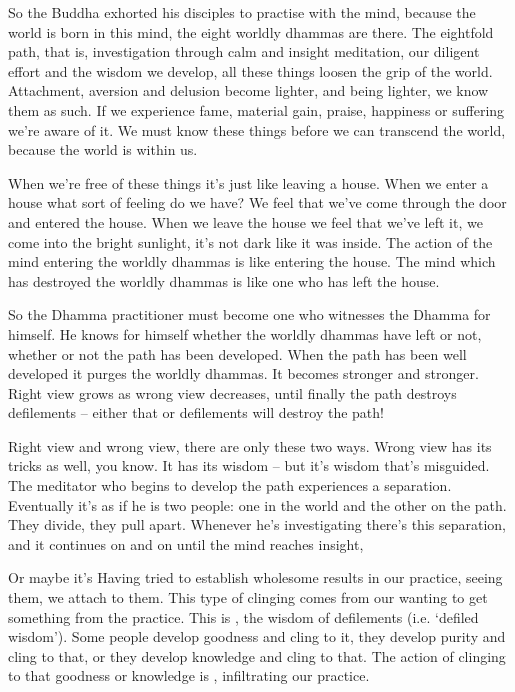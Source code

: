 So the Buddha exhorted his disciples to practise with the mind, because the world is born in this mind, the eight worldly dhammas are there. The eightfold path, that is, investigation through calm and insight meditation, our diligent effort and the wisdom we develop, all these things loosen the grip of the world. Attachment, aversion and delusion become lighter, and being lighter, we know them as such. If we experience fame, material gain, praise, happiness or suffering we're aware of it. We must know these things before we can transcend the world, because the world is within us. 

When we're free of these things it's just like leaving a house. When we enter a house what sort of feeling do we have? We feel that we've come through the door and entered the house. When we leave the house we feel that we've left it, we come into the bright sunlight, it's not dark like it was inside. The action of the mind entering the worldly dhammas is like entering the house. The mind which has destroyed the worldly dhammas is like one who has left the house. 

So the Dhamma practitioner must become one who witnesses the Dhamma for himself. He knows for himself whether the worldly dhammas have left or not, whether or not the path has been developed. When the path has been well developed it purges the worldly dhammas. It becomes stronger and stronger. Right view grows as wrong view decreases, until finally the path destroys defilements -- either that or defilements will destroy the path! 

Right view and wrong view, there are only these two ways. Wrong view has its tricks as well, you know. It has its wisdom -- but it's wisdom that's misguided. The meditator who begins to develop the path experiences a separation. Eventually it's as if he is two people: one in the world and the other on the path. They divide, they pull apart. Whenever he's investigating there's this separation, and it continues on and on until the mind reaches insight, 

Or maybe it's  Having tried to establish wholesome results in our practice, seeing them, we attach to them. This type of clinging comes from our wanting to get something from the practice. This is , the wisdom of defilements (i.e. `defiled wisdom'). Some people develop goodness and cling to it, they develop purity and cling to that, or they develop knowledge and cling to that. The action of clinging to that goodness or knowledge is , infiltrating our practice. 

